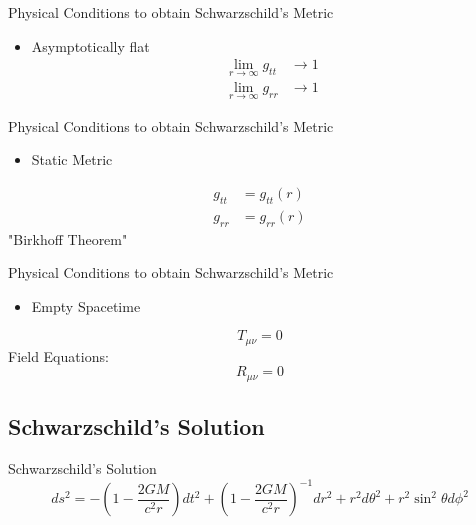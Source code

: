 \documentclass{beamer}
\begin{document}
\begin{darkframes}
        \begin{frame}{Physical Conditions to obtain Schwarzschild's Metric}
        	\begin{itemize}
            \item Asymptotically flat
            \pause
            \begin{align*}
            \lim_{r \rightarrow \infty} g_{tt} &\longrightarrow 1 \\
            \lim_{r \rightarrow \infty} g_{rr} &\longrightarrow 1
            \end{align*}
        	\end{itemize}
        \end{frame}
        
        \begin{frame}{Physical Conditions to obtain Schwarzschild's Metric}
        	\begin{itemize}
            \item Static Metric
        	\end{itemize}
            \pause
            \begin{align*}
            g_{tt} &= g_{tt} (r)\\
            g_{rr} &= g_{rr} (r)
            \end{align*}
            \pause
            \centering
            {"Birkhoff Theorem"}
        \end{frame}
        
        \begin{frame}{Physical Conditions to obtain Schwarzschild's Metric}
        	\begin{itemize}
            \item Empty Spacetime
        	\end{itemize}
            \pause
            $$ T_{\mu\nu} = 0 $$
            \pause
            \bigskip
            Field Equations:
            $$ R_{\mu\nu} = 0 $$
        \end{frame}
        
    \subsection{Schwarzschild's Solution}
    	\begin{frame}{Schwarzschild's Solution}
    		$$ ds^2 = - \left( 1 - \frac{2GM}{c^2 r} \right) dt^2 
            + \left( 1 - \frac{2GM}{c^2 r} \right)^{-1} dr^2 
            + r^2 d\theta^2 + r^2 \sin^2 \theta d\phi^2 $$
            \pause
            \bigskip
            

\end{frame}
\end{darkframes}
\end{document}
